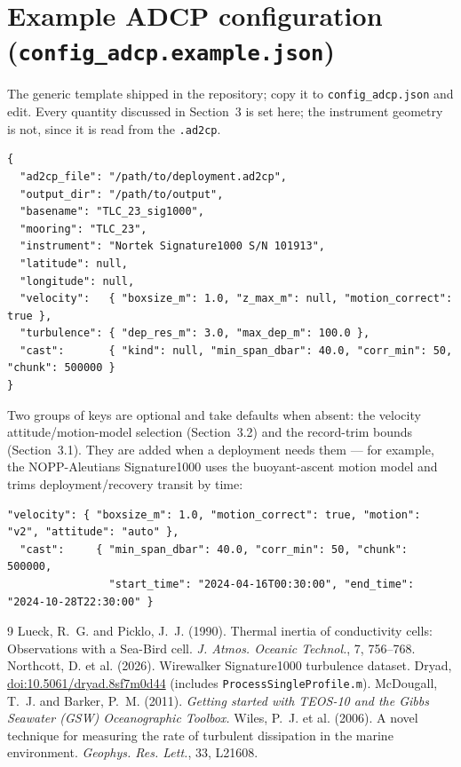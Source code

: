 \documentclass[11pt]{article}
\newcommand{\code}[1]{\texttt{#1}}
\begin{document}
\section{Example ADCP configuration (\code{config\_adcp.example.json})}

The generic template shipped in the repository; copy it to \code{config\_adcp.json} and edit.
Every quantity discussed in Section~3 is set here; the instrument geometry is not, since it is
read from the \code{.ad2cp}.

\begin{lstlisting}[style=cfg]
{
  "ad2cp_file": "/path/to/deployment.ad2cp",
  "output_dir": "/path/to/output",
  "basename": "TLC_23_sig1000",
  "mooring": "TLC_23",
  "instrument": "Nortek Signature1000 S/N 101913",
  "latitude": null,
  "longitude": null,
  "velocity":   { "boxsize_m": 1.0, "z_max_m": null, "motion_correct": true },
  "turbulence": { "dep_res_m": 3.0, "max_dep_m": 100.0 },
  "cast":       { "kind": null, "min_span_dbar": 40.0, "corr_min": 50, "chunk": 500000 }
}
\end{lstlisting}

\noindent Two groups of keys are optional and take defaults when absent: the velocity
attitude/motion-model selection (Section~3.2) and the record-trim bounds (Section~3.1). They
are added when a deployment needs them --- for example, the NOPP-Aleutians Signature1000 uses
the buoyant-ascent motion model and trims deployment/recovery transit by time:

\begin{lstlisting}[style=cfg]
  "velocity": { "boxsize_m": 1.0, "motion_correct": true, "motion": "v2", "attitude": "auto" },
  "cast":     { "min_span_dbar": 40.0, "corr_min": 50, "chunk": 500000,
                "start_time": "2024-04-16T00:30:00", "end_time": "2024-10-28T22:30:00" }
\end{lstlisting}

\begin{thebibliography}{9}
 Lueck, R.~G. and Picklo, J.~J. (1990). Thermal inertia of conductivity
cells: Observations with a Sea-Bird cell. \emph{J. Atmos. Oceanic Technol.}, 7, 756--768.
 Northcott, D. et al. (2026). Wirewalker Signature1000 turbulence
dataset. Dryad, \href{https://doi.org/10.5061/dryad.8sf7m0d44}{doi:10.5061/dryad.8sf7m0d44}
(includes \code{ProcessSingleProfile.m}).
 McDougall, T.~J. and Barker, P.~M. (2011). \emph{Getting started with TEOS-10
and the Gibbs Seawater (GSW) Oceanographic Toolbox.}
 Wiles, P.~J. et al. (2006). A novel technique for measuring the rate of
turbulent dissipation in the marine environment. \emph{Geophys. Res. Lett.}, 33, L21608.
\end{thebibliography}
\end{document}
